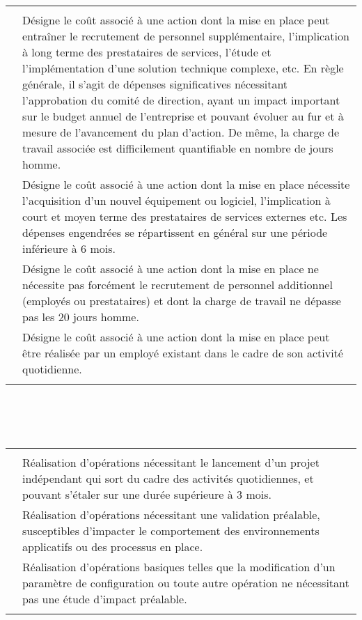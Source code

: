 \newpage


\begin{tabular}{!{\color{bharray}\vline}m{3cm}m{12cm}!{\color{bharray}\vline}}
  \bhline
  \\
  \bhline
   & Désigne le coût associé à une action dont la mise en place peut entraîner le recrutement de personnel supplémentaire, l’implication à long terme des prestataires de services, l’étude et l’implémentation d’une solution technique complexe, etc. En règle générale, il s’agit de dépenses significatives nécessitant l’approbation du comité de direction, ayant un impact important sur le budget annuel de l’entreprise et pouvant évoluer au fur et à mesure de l’avancement du plan d’action. De même, la charge de travail associée est difficilement quantifiable en nombre de jours homme.\\
  \bhline
   & Désigne le coût associé à une action dont la mise en place nécessite l’acquisition d’un nouvel équipement ou logiciel, l’implication à court et moyen terme des prestataires de services externes etc. Les dépenses engendrées se répartissent en général sur une période inférieure à 6 mois.\\
  \bhline
   & Désigne le coût associé à une action dont la mise en place ne nécessite pas forcément le recrutement de personnel additionnel (employés ou prestataires) et dont la charge de travail ne dépasse pas les 20 jours homme.\\
  \bhline
   & Désigne le coût associé à une action dont la mise en place peut être réalisée par un employé existant dans le cadre de son activité quotidienne.\\
  \bhline
\end{tabular}\\\\\\


\begin{tabular}{!{\color{bharray}\vline}m{3cm}m{12cm}!{\color{bharray}\vline}}
  \bhline
  \\
  \bhline
   & Réalisation d’opérations nécessitant le lancement d’un projet indépendant qui sort du cadre des activités quotidiennes, et pouvant s’étaler sur une durée supérieure à 3 mois.\\
  \bhline
   & Réalisation d’opérations nécessitant une validation préalable, susceptibles d’impacter le comportement des environnements applicatifs ou des processus en place.\\
  \bhline
   & Réalisation d’opérations basiques telles que la modification d’un paramètre de configuration ou toute autre opération ne nécessitant pas une étude d’impact préalable.\\
  \bhline
\end{tabular}

\newpage
